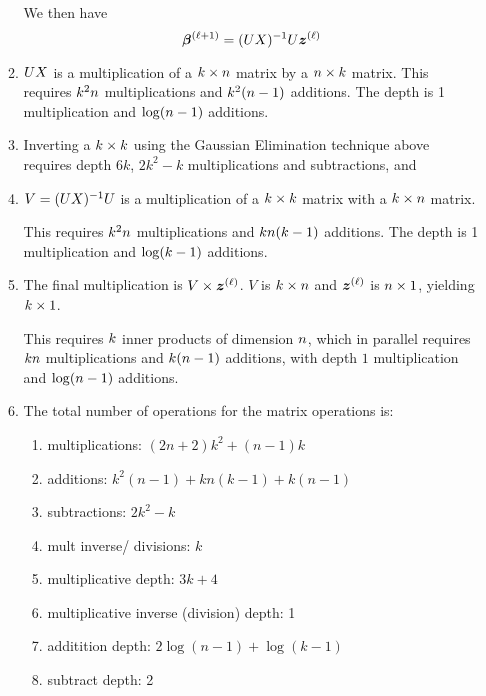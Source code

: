 \begin{enumerate}
\begin{enumerate}
		We then have 
		\begin{equation}
		\coefficients{\step+1} = \inversemat{(U\xdata)}U\updatevector{\step}
		\end{equation}

		\item $U X$ is a multiplication of a $k \times n$ matrix by a $n \times k$ matrix.
		This requires $k^{2}n$ multiplications and $k^{2}(n-1) $ additions. 
		The depth is 1 multiplication and $\log(n-1)$ additions.
	
		\item Inverting a $k \times k$ using the Gaussian Elimination technique above requires
		depth $6k$, $2k^{2} - k$ multiplications and subtractions, and 

		\item $V = (U X)^{-1}U$ is a multiplication of a $k \times k$ matrix with a $k \times n$ matrix. 
		
		This requires $k^{2}n$ multiplications and $kn(k-1)$ additions. The depth is 1 multiplication and $\log(k-1)$ additions.
	
	
		\item The final multiplication is $V \times \updatevector{\step}$.
		$V$ is $k \times n$ and $\updatevector{\step}$  is $n \times 1$, yielding $k \times 1$.
		
		This requires $k$ inner products of dimension $n$, which in parallel requires $kn$ multiplications and $k(n-1)$ additions, with depth $1$ multiplication and $\log(n-1)$ additions.
		
		\item The total number of operations for the matrix operations is:
		\begin{enumerate}
			\item multiplications: 
			$(2n+2)k^{2} + (n-1)k $
			\item additions: $k^{2}(n-1) + kn(k-1) + k(n-1)$ 
			\item subtractions: $2k^{2} -k $ 
			\item mult inverse/ divisions: $k$
			\item multiplicative depth: $3k + 4 $
			\item multiplicative inverse (division) depth: 1
			\item additition depth: $ 2 \log(n-1) + \log(k-1)$ 
			\item subtract depth: 2
		\end{enumerate}
	\end{enumerate}

\end{enumerate}


